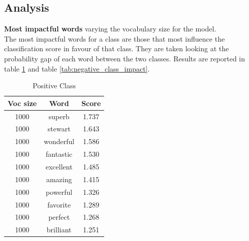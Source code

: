 \documentclass{article}
\begin{document}
\subsection{Analysis}
\textbf{Most impactful words} varying the vocabulary size for the model.\\
The most impactful words for a class are those that most influence the classification score in favour of that class. They are taken looking at the probability
gap of each word between the two classes.
Results are reported in table \ref{tab:positive_class_impact} and table \ref{tab:negative_class_impact}.


\begin{multicols}{2}

    \begin{table}[H]
        \centering
        \caption{\small Positive Class}
        \label{tab:positive_class_impact}
        \begin{tabular}{ |c|c|c| } 
        \hline
        \textbf{Voc size} & \textbf{Word} & \textbf{Score} \\ \hline
        1000 & superb & 1.737 \\ \hline
        1000 & stewart & 1.643 \\ \hline
        1000 & wonderful & 1.586 \\ \hline
        1000 & fantastic & 1.530 \\ \hline
        1000 & excellent & 1.485 \\ \hline
        1000 & amazing & 1.415 \\ \hline
        1000 & powerful & 1.326 \\ \hline
        1000 & favorite & 1.289 \\ \hline
        1000 & perfect & 1.268 \\ \hline
        1000 & brilliant & 1.251 \\ \hline
        \end{tabular}
    \end{table}



\end{multicols}
\end{document}
